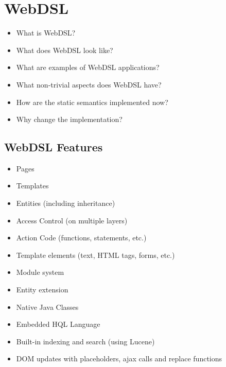 
\chapter{\label{chap:webdsl}WebDSL}

  \begin{itemize}
    \item What is WebDSL?
    \item What does WebDSL look like?
    \item What are examples of WebDSL applications?
    \item What non-trivial aspects does WebDSL have?
    \item How are the static semantics implemented now?
    \item Why change the implementation?
  \end{itemize}

  \section{WebDSL Features}

    \begin{itemize}
      \item Pages
      \item Templates
      \item Entities (including inheritance)
      \item Access Control (on multiple layers)
      \item Action Code (functions, statements, etc.)
      \item Template elements (text, HTML tags, forms, etc.)
      \item Module system
      \item Entity extension
      \item Native Java Classes
      \item Embedded HQL Language
      \item Built-in indexing and search (using Lucene)
      \item DOM updates with placeholders, ajax calls and replace functions
    \end{itemize}
